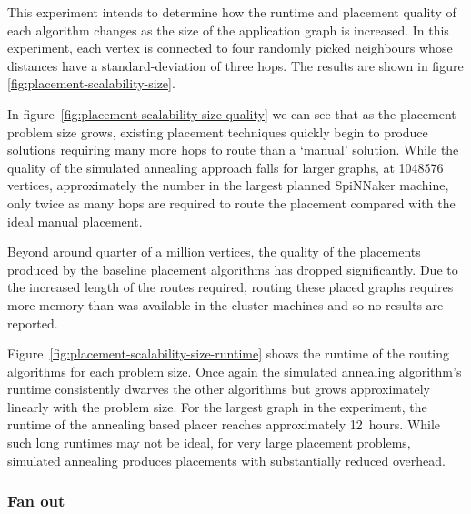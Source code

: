 				This experiment intends to determine how the runtime and placement
				quality of each algorithm changes as the size of the application graph
				is increased. In this experiment, each vertex is connected to four
				randomly picked neighbours whose distances have a standard-deviation of
				three hops. The results are shown in figure
				\ref{fig:placement-scalability-size}.
				
				In figure~\ref{fig:placement-scalability-size-quality} we can see that
				as the placement problem size grows, existing placement techniques
				quickly begin to produce solutions requiring many more hops to route
				than a `manual' solution. While the quality of the simulated annealing
				approach falls for larger graphs, at \num{1048576} vertices,
				approximately the number in the largest planned SpiNNaker machine, only
				twice as many hops are required to route the placement compared with
				the ideal manual placement.
				
				Beyond around quarter of a million vertices, the quality of the
				placements produced by the baseline placement algorithms has dropped
				significantly. Due to the increased length of the routes required,
				routing these placed graphs requires more memory than was available in
				the cluster machines and so no results are reported.
				
				Figure~\ref{fig:placement-scalability-size-runtime} shows the runtime
				of the routing algorithms for each problem size. Once again the
				simulated annealing algorithm's runtime consistently dwarves the other
				algorithms but grows approximately linearly with the problem size. For
				the largest graph in the experiment, the runtime of the annealing based
				placer reaches approximately 12~hours. While such long runtimes may not
				be ideal, for very large placement problems, simulated annealing
				produces placements with substantially reduced overhead.
			
			\subsubsection{Fan out}
			
